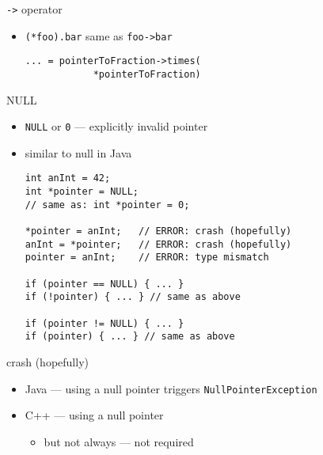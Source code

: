 




\begin{frame}[fragile,label=arrowOp]{\texttt{-\textgreater} operator}
\lstset{
    language=C++,
    style=small
}
    \begin{itemize}
        \item \lstinline|(*foo).bar| same as \lstinline|foo->bar|
\begin{lstlisting}
... = pointerToFraction->times(
            *pointerToFraction)
\end{lstlisting}
    \end{itemize}
\end{frame}


\begin{frame}[fragile,label=NULL]{NULL}
\lstset{language=C++,style=small}
    \begin{itemize}
    \item \verb|NULL| or \verb|0| --- explicitly invalid pointer
    \item similar to null in Java
\begin{lstlisting}
int anInt = 42;
int *pointer = NULL;
// same as: int *pointer = 0;

*pointer = anInt;   // ERROR: crash (hopefully)
anInt = *pointer;   // ERROR: crash (hopefully)
pointer = anInt;    // ERROR: type mismatch

if (pointer == NULL) { ... }
if (!pointer) { ... } // same as above

if (pointer != NULL) { ... }
if (pointer) { ... } // same as above
\end{lstlisting}
    \end{itemize}
\end{frame}

\begin{frame}[fragile,label=NullErrors]{crash (hopefully)}
\lstset{language=C++,style=small}
    \begin{itemize}
        \item Java --- using a null pointer triggers \texttt{NullPointerException}
        \item C++ --- using a null pointer 
            \begin{itemize}
            \item but not always --- not required
            \end{itemize}
    \end{itemize}
\end{frame}

